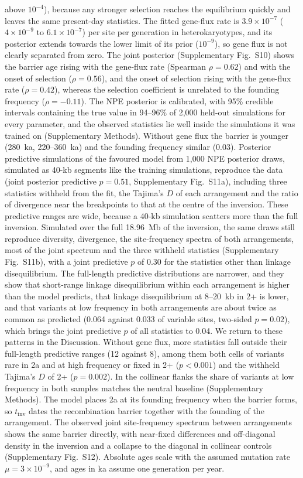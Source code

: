 \documentclass[11pt]{article}
\begin{document}
above $10^{-4}$), because any stronger selection reaches the equilibrium quickly and leaves the same present-day
statistics. The fitted gene-flux rate is $3.9\times10^{-7}$ ($4\times10^{-9}$ to $6.1\times10^{-7}$) per site per generation in heterokaryotypes, and its posterior extends towards the lower limit of its prior ($10^{-9}$), so gene flux is not clearly separated from zero. The joint posterior (Supplementary Fig.~S10) shows the barrier age rising with the gene-flux rate (Spearman $\rho=0.62$) and with the onset of selection ($\rho=0.56$), and the onset of selection rising with the gene-flux rate ($\rho=0.42$), whereas the selection coefficient
is unrelated to the founding frequency ($\rho=-0.11$). The NPE posterior is calibrated, with 95\% credible intervals
containing the true value in 94--96\% of 2{,}000 held-out simulations for every parameter, and the observed
statistics lie well inside the simulations it was trained on (Supplementary Methods). Without gene flux the barrier
is younger (280~ka, 220--360~ka) and the founding frequency similar (0.03). Posterior predictive simulations of the
favoured model from 1{,}000 NPE posterior draws, simulated as 40-kb segments like the training simulations, reproduce the data (joint posterior predictive $p=0.51$, Supplementary
Fig.~S11a), including three statistics withheld from the fit, the Tajima's $D$ of each arrangement and the ratio of
divergence near the breakpoints to that at the centre of the inversion. These predictive ranges are wide, because a 40-kb simulation scatters more than the full inversion. Simulated over the full 18.96~Mb of the inversion, the same draws still reproduce diversity, divergence, the site-frequency spectra of both arrangements, most of the joint spectrum and the three withheld statistics (Supplementary Fig.~S11b), with a joint predictive $p$ of 0.30 for the statistics other than linkage disequilibrium. The full-length predictive distributions are narrower, and they show that short-range linkage disequilibrium within each arrangement is higher than the model predicts, that linkage disequilibrium at 8--20~kb in 2+ is lower, and that variants at low frequency in both arrangements are about twice as common as predicted (0.064 against 0.033 of variable sites, two-sided $p=0.02$), which brings the joint predictive $p$ of all statistics to 0.04. We return to these patterns in the Discussion. Without gene flux, more statistics fall outside their full-length predictive ranges (12 against 8), among them both cells of variants rare in 2a and at high frequency or fixed in 2+ ($p<0.001$) and the withheld Tajima's $D$ of 2+ ($p=0.002$). In
the collinear flanks the share of variants at low frequency in both samples matches the neutral baseline (Supplementary Methods). The model places 2a at its founding frequency when the barrier forms, so
$t_\mathrm{inv}$ dates the recombination barrier together with the founding of the arrangement. The observed joint
site-frequency spectrum between arrangements shows the same barrier directly, with near-fixed differences and
off-diagonal density in the inversion and a collapse to the diagonal in collinear controls (Supplementary Fig.~S12).
Absolute ages scale with the assumed mutation rate $\mu=3\times10^{-9}$, and ages in ka assume one generation per year.
\end{document}

